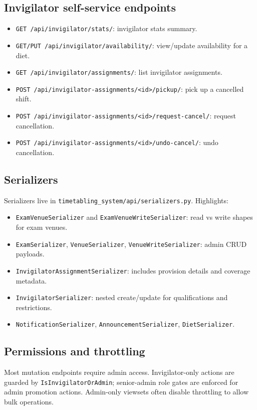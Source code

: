 \subsection{Invigilator self-service endpoints}
\label{subsec:api:invigilator}

\begin{itemize}
  \item \texttt{GET /api/invigilator/stats/}: invigilator stats summary.
  \item \texttt{GET/PUT /api/invigilator/availability/}: view/update availability for a diet.
  \item \texttt{GET /api/invigilator/assignments/}: list invigilator assignments.
  \item \texttt{POST /api/invigilator-assignments/<id>/pickup/}: pick up a cancelled shift.
  \item \texttt{POST /api/invigilator-assignments/<id>/request-cancel/}: request cancellation.
  \item \texttt{POST /api/invigilator-assignments/<id>/undo-cancel/}: undo cancellation.
\end{itemize}

\subsection{Serializers}
\label{subsec:api:serializers}

Serializers live in \texttt{timetabling\_system/api/serializers.py}. Highlights:

\begin{itemize}
  \item \texttt{ExamVenueSerializer} and \texttt{ExamVenueWriteSerializer}: read vs write shapes for exam venues.
  \item \texttt{ExamSerializer}, \texttt{VenueSerializer}, \texttt{VenueWriteSerializer}: admin CRUD payloads.
  \item \texttt{InvigilatorAssignmentSerializer}: includes provision details and coverage metadata.
  \item \texttt{InvigilatorSerializer}: nested create/update for qualifications and restrictions.
  \item \texttt{NotificationSerializer}, \texttt{AnnouncementSerializer}, \texttt{DietSerializer}.
\end{itemize}

\subsection{Permissions and throttling}
\label{subsec:api:permissions}

Most mutation endpoints require admin access. Invigilator-only actions are guarded by \texttt{IsInvigilatorOrAdmin}; senior-admin role gates are enforced for admin promotion actions. Admin-only viewsets often disable throttling to allow bulk operations.
